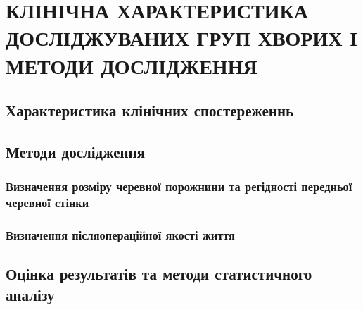 \chapter{КЛІНІЧНА ХАРАКТЕРИСТИКА ДОСЛІДЖУВАНИХ ГРУП ХВОРИХ І МЕТОДИ ДОСЛІДЖЕННЯ}
\section{Характеристика клінічних спостереженнь}
\section{Методи дослідження}
\subsection{Визначення розміру черевної порожнини та регідності передньої черевної стінки}
\subsection{Визначення післяопераційної якості життя}
\section{Оцінка результатів та методи статистичного аналізу}